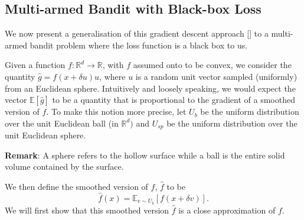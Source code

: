 \subsection{Multi-armed Bandit with Black-box Loss}
We now present a generalisation of this gradient descent approach [\cite{2005Flaxman}] to a multi-armed bandit problem where the loss function is a black box to us.

Given a function $f: \mathbb{R}^d \to \mathbb{R}$, with $f$ assumed onto to be convex, we consider the quantity $\hat{g} = f(x + \delta u)u$, where $u$ is a random unit vector sampled (uniformly) from an Euclidean sphere. Intuitively and loosely speaking, we would expect the vector $\mathbb{E}[\hat{g}]$ to be a quantity that is proportional to the gradient of a smoothed version of $f$. To make this notion more precise, let $U_b$ be the uniform distribution over the unit Euclidean ball (in $\mathbb{R}^d)$ and $U_{sp}$ be the uniform distribution over the unit Euclidean sphere. 

\noindent \textbf{Remark}: A sphere refers to the hollow surface while a ball is the entire solid volume contained by the surface.

\noindent We then define the smoothed version of $f$, $\hat{f}$ to be
$$ \hat{f}(x) = \mathbb{E}_{v \sim U_b} [f(x + \delta v)]. $$
We will first show that this smoothed version $\hat{f}$ is a close approximation of $f$.

